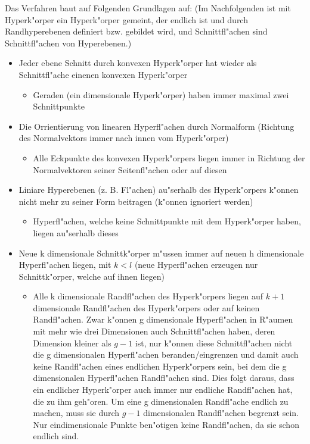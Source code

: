 Das Verfahren baut auf Folgenden Grundlagen auf:
(Im Nachfolgenden ist mit Hyperk"orper ein Hyperk"orper gemeint, der endlich ist und durch Randhyperebenen definiert bzw. gebildet wird, und Schnittfl"achen sind Schnittfl"achen von Hyperebenen.)
\begin{itemize}
 \item Jeder ebene Schnitt durch konvexen Hyperk"orper hat wieder als Schnittfl"ache einenen konvexen Hyperk"orper
 \begin{itemize}
  \item Geraden (ein dimensionale Hyperk"orper) haben immer maximal zwei Schnittpunkte
 \end{itemize}
 \item Die Orrientierung von linearen Hyperfl"achen durch Normalform (Richtung des Normalvektors immer nach innen vom Hyperk"orper)
 \begin{itemize}
  \item Alle Eckpunkte des konvexen Hyperk"orpers liegen immer in Richtung der Normalvektoren seiner Seitenfl"achen oder auf diesen
 \end{itemize}
 \item Liniare Hyperebenen (z. B. Fl"achen) au"serhalb des Hyperk"orpers k"onnen nicht mehr zu seiner Form beitragen (k"onnen ignoriert werden)
 \begin{itemize}
  \item Hyperfl"achen, welche keine Schnittpunkte mit dem Hyperk"orper haben, liegen au"serhalb dieses
 \end{itemize}
 \item Neue k dimensionale Schnittk"orper m"ussen immer auf neuen h dimensionale Hyperfl"achen liegen, mit $k < l$ (neue Hyperfl"achen erzeugen nur Schnittk"orper, welche auf ihnen liegen)
 \begin{itemize}
  \item Alle k dimensionale Randfl"achen des Hyperk"orpers liegen auf $k+1$ dimensionale Randfl"achen des Hyperk"orpers oder auf keinen Randfl"achen. Zwar k"onnen g dimensionale Hyperfl"achen in R"aumen mit mehr wie drei Dimensionen auch Schnittfl"achen haben, deren Dimension kleiner als $g-1$ ist, nur k"onnen diese Schnittfl"achen nicht die g dimensionalen Hyperfl"achen beranden/eingrenzen und damit auch keine Randfl"achen eines endlichen Hyperk"orpers sein, bei dem die g dimensionalen Hyperfl"achen Randfl"achen sind. Dies folgt daraus, dass ein endlicher Hyperk"orper auch immer nur endliche Randfl"achen hat, die zu ihm geh"oren. Um eine g dimensionalen Randfl"ache endlich zu machen, muss sie durch $g-1$ dimensionalen Randfl"achen begrenzt sein. Nur eindimensionale Punkte ben"otigen keine Randfl"achen, da sie schon endlich sind.

\end{itemize}
\end{itemize}

